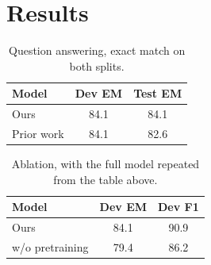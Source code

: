 \documentclass{article}
\begin{document}
\section{Results}

\begin{table}
\begin{tabular}{lcc}
Model & Dev EM & Test EM \\
\hline
Ours & 84.1 & 84.1 \\
Prior work & 84.1 & 82.6 \\
\end{tabular}
\caption{Question answering, exact match on both splits.}
\end{table}

\begin{table}
\begin{tabular}{lcc}
Model & Dev EM & Dev F1 \\
\hline
Ours & 84.1 & 90.9 \\
w/o pretraining & 79.4 & 86.2 \\
\end{tabular}
\caption{Ablation, with the full model repeated from the table above.}
\end{table}
\end{document}
